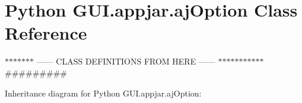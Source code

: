 \hypertarget{class_python_01_g_u_i_1_1appjar_1_1aj_option}{}\section{Python G\+U\+I.\+appjar.\+aj\+Option Class Reference}
\label{class_python_01_g_u_i_1_1appjar_1_1aj_option}


$\ast$$\ast$$\ast$$\ast$$\ast$$\ast$$\ast$ ------ C\+L\+A\+SS D\+E\+F\+I\+N\+I\+T\+I\+O\+NS F\+R\+OM H\+E\+RE ------ $\ast$$\ast$$\ast$$\ast$$\ast$$\ast$$\ast$$\ast$$\ast$$\ast$$\ast$ \#\#\#\#\#\#\#\#\#  




Inheritance diagram for Python G\+U\+I.\+appjar.\+aj\+Option\+:
